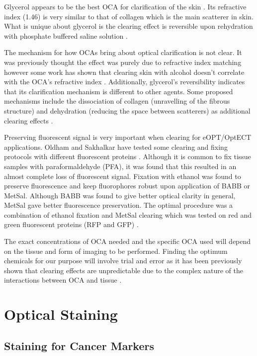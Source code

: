 	Glycerol appears to be the best OCA for clarification of the skin \cite{Vargas:1999, Wen:2009is}. Its refractive index (1.46) is very similar to that of collagen which is the main scatterer in skin. What is unique about glycerol is the clearing effect is reversible upon rehydration with phosphate buffered saline solution \cite{Vargas:1999}. 
	
	The mechanism for how OCAs bring about optical clarification is not clear. It was previously thought the effect was purely due to refractive index matching however some work has shown that clearing skin with alcohol doesn't correlate with the OCA's refractive index \cite{Choi:2005, Mao:2008}. Additionally, glycerol's reversibility indicates that its clarification mechanism is different to other agents. Some  proposed mechanisms include the dissociation of collagen (unravelling of the fibrous structure) and  dehydration (reducing the space between scatterers) as additional clearing effects \cite{Yeh:2003, Wen:2009is}.
	
	
	
	
	Preserving fluorescent signal is very important when clearing for eOPT/OptECT applications. Oldham and Sakhalkar have tested some clearing and fixing protocols with different fluorescent proteins \cite{Sakhalkar:2007hp, Oldham:2008dfa}. Although it is common to fix tissue samples with paraformaldehyde (PFA), it was found that this resulted in an almost complete loss of fluorescent signal. Fixation with ethanol was found to preserve fluorescence and keep fluorophores robust upon application of BABB or MetSal. Although BABB was found to give better optical clarity in general, MetSal gave better fluorescence preservation. The optimal procedure was a combination of ethanol fixation and MetSal clearing which was tested on red and green fluorescent proteins (RFP and GFP) \cite{Sakhalkar:2007hp}.
	
	
	The exact concentrations of OCA needed and the specific OCA used will depend on the tissue and form of imaging to be performed. Finding the optimum chemicals for our purpose will involve trial and error as it has been previously shown that clearing effects are unpredictable due to the complex nature of the interactions between OCA and tissue \cite{Wen:2009is}.
	
	
	
	\section{Optical Staining}
	\subsection{Staining for Cancer Markers}
	
